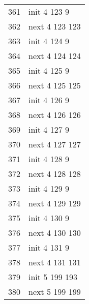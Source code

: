 \begin{center}
\begin{tabular}[h!]{>{\ttfamily\color{UniRed}}r >{\ttfamily}l }
        \end{tabular}\quad
        \begin{tabular}[h!]{>{\ttfamily\color{UniRed}}r >{\ttfamily}l  }
                361 & init \color{UniGrey} 4 \color{UniRed} 123 9   \\
                362 & next \color{UniGrey} 4 \color{UniRed} 123 123 \\
                363 & init \color{UniGrey} 4 \color{UniRed} 124 9   \\
                364 & next \color{UniGrey} 4 \color{UniRed} 124 124 \\
                365 & init \color{UniGrey} 4 \color{UniRed} 125 9   \\
                366 & next \color{UniGrey} 4 \color{UniRed} 125 125 \\
                367 & init \color{UniGrey} 4 \color{UniRed} 126 9   \\
                368 & next \color{UniGrey} 4 \color{UniRed} 126 126 \\
                369 & init \color{UniGrey} 4 \color{UniRed} 127 9   \\
                370 & next \color{UniGrey} 4 \color{UniRed} 127 127 \\
                371 & init \color{UniGrey} 4 \color{UniRed} 128 9   \\
                372 & next \color{UniGrey} 4 \color{UniRed} 128 128 \\
                373 & init \color{UniGrey} 4 \color{UniRed} 129 9   \\
                374 & next \color{UniGrey} 4 \color{UniRed} 129 129 \\
                375 & init \color{UniGrey} 4 \color{UniRed} 130 9   \\
                376 & next \color{UniGrey} 4 \color{UniRed} 130 130 \\
                377 & init \color{UniGrey} 4 \color{UniRed} 131 9   \\
                378 & next \color{UniGrey} 4 \color{UniRed} 131 131 \\
                379 & init \color{UniGrey} 5 \color{UniRed} 199 193 \\
                380 & next \color{UniGrey} 5 \color{UniRed} 199 199
        \end{tabular}
\end{center}

